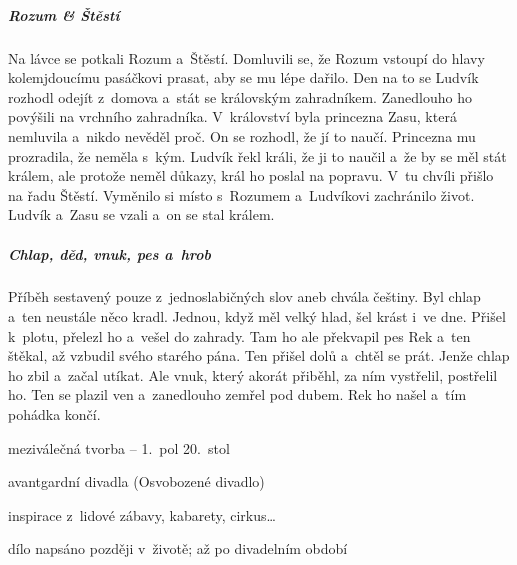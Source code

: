 {{\subparagraph{Rozum \& Štěstí}
	Na lávce se potkali Rozum a~Štěstí. Domluvili se, že Rozum vstoupí do hlavy
	kolemjdoucímu pasáčkovi prasat, aby se mu lépe dařilo. Den na to se Ludvík
	rozhodl odejít z~domova a~stát se královským zahradníkem. Zanedlouho ho
	povýšili na vrchního zahradníka. V~království byla princezna Zasu, která
	nemluvila a~nikdo nevěděl proč. On se rozhodl, že jí to naučí. Princezna mu
	prozradila, že neměla s~kým. Ludvík řekl králi, že ji to naučil a~že by se
	měl stát králem, ale protože neměl důkazy, král ho poslal na popravu. V~tu
	chvíli přišlo na řadu Štěstí. Vyměnilo si místo s~Rozumem a~Ludvíkovi
	zachránilo život. Ludvík a~Zasu se vzali a~on se stal králem.

\subparagraph{Chlap, děd, vnuk, pes a~hrob}
	Příběh sestavený pouze z~jednoslabičných slov aneb chvála češtiny. Byl
	chlap a~ten neustále něco kradl. Jednou, když měl velký hlad, šel krást
	i~ve dne. Přišel k~plotu, přelezl ho a~vešel do zahrady. Tam ho ale
	překvapil pes Rek a~ten štěkal, až vzbudil svého starého pána. Ten přišel
	dolů a~chtěl se prát. Jenže chlap ho zbil a~začal utíkat. Ale vnuk, který
	akorát přiběhl, za ním vystřelil, postřelil ho. Ten se plazil ven
	a~zanedlouho zemřel pod dubem. Rek ho našel a~tím pohádka končí.
}


\newpart


\newpart



\begin{compactitem}
	\item meziválečná tvorba -- 1.~pol 20.~stol
	\item avantgardní divadla (Osvobozené divadlo)
	\item inspirace z~lidové zábavy, kabarety, cirkus\dots
	\item dílo napsáno později v~životě; až po divadelním období
\end{compactitem}

}
